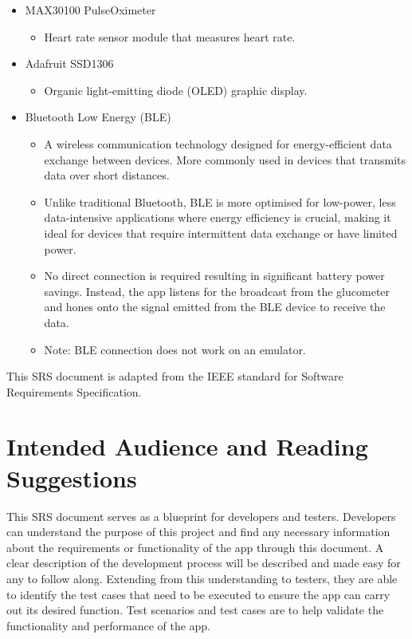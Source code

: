 \documentclass[a4paper]{scrreprt}
\begin{document}
\begin{itemize}
  \item MAX30100 PulseOximeter
  \begin{itemize}
      \item Heart rate sensor module that measures heart rate.
  \end{itemize}

  \item Adafruit SSD1306
  \begin{itemize}
      \item Organic light-emitting diode (OLED) graphic display.
  \end{itemize}

  \item Bluetooth Low Energy (BLE)
  \begin{itemize}
      \item A wireless communication technology designed for energy-efficient data exchange between devices. More commonly used in devices that transmits data over short distances.
      \item Unlike traditional Bluetooth, BLE is more optimised for low-power, less data-intensive applications where energy efficiency is crucial, making it ideal for devices that require intermittent data exchange or have limited power.
      \item No direct connection is required resulting in significant battery power savings. Instead, the app listens for the broadcast from the glucometer and hones onto the signal emitted from the BLE device to receive the data.
      \item Note: BLE connection does not work on an emulator.
  \end{itemize}
\end{itemize}
This SRS document is adapted from the IEEE standard for Software Requirements Specification.


\section{Intended Audience and Reading Suggestions}
This SRS document serves as a blueprint for developers and testers.
\newline
Developers can understand the purpose of this project and find any necessary information about the requirements or functionality of the app through this document. A clear description of the development process will be described and made easy for any to follow along.
\newline
Extending from this understanding to testers, they are able to identify the test cases that need to be executed to ensure the app can carry out its desired function. Test scenarios and test cases are to help validate the functionality and performance of the app.
\end{document}
